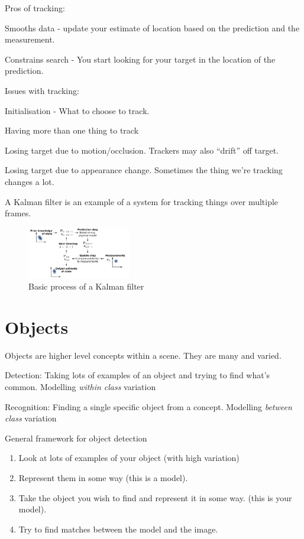\documentclass[8pt]{extarticle}
\begin{document}
\begin{multicols}{2}
Pros of tracking:
\begin{compactitem}
    \item Smooths data - update your estimate of location based on the prediction and the measurement.
    \item Constrains search - You start looking for your target in the location of the prediction.
\end{compactitem}

Issues with tracking:
\begin{compactitem}
    \item Initialisation - What to choose to track.
    \item Having more than one thing to track
    \item Losing target due to motion/occlusion. Trackers may also ``drift'' off target.
    \item Losing target due to appearance change. Sometimes the thing we're tracking changes a lot.
\end{compactitem}

A Kalman filter is an example of a system for tracking things over multiple frames.
\begin{figure}[H]
    \centering
    \includegraphics[width=0.4\textwidth]{Kalman_filter.png}
    \caption{Basic process of a Kalman filter}
    \label{fig:kalman-filter}
\end{figure}

\section{Objects}
Objects are higher level concepts within a scene. They are many and varied.

\begin{compactitem}
    \item Detection: Taking lots of examples of an object and trying to find what's common. Modelling \textit{within class} variation
    \item Recognition: Finding a single specific object from a concept. Modelling \textit{between class} variation
\end{compactitem}

General framework for object detection
\begin{enumerate}
    \item Look at lots of examples of your object (with high variation)
    \item Represent them in some way (this is a model).
    \item Take the object you wish to find and represent it in some way. (this is your model).
    \item Try to find matches between the model and the image.
\end{enumerate}


\end{multicols}
\end{document}
